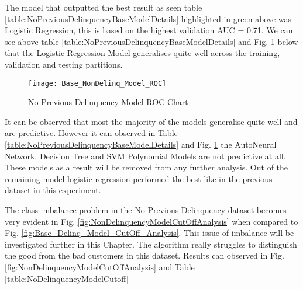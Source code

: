 The model that outputted the best result as seen table \ref{table:NoPreviousDelinquencyBaseModelDetails} highlighted in green above  was Logistic Regression, this is based on the highest validation AUC = 0.71. We can see above table \ref{table:NoPreviousDelinquencyBaseModelDetails} and Fig. \ref{fig:NonDelinq_Model_ROC} below that the Logistic Regression Model generalises quite well across the training, validation and testing partitions.

\begin{figure}[H]
	\texttt{[image: Base\_NonDelinq\_Model\_ROC]}
	\caption{No Previous Delinquency Model ROC Chart}
	\label{fig:NonDelinq_Model_ROC}
\end{figure}

It can be observed that most the majority of the models generalise quite well and are predictive. However it can observed in Table \ref{table:NoPreviousDelinquencyBaseModelDetails} and Fig. \ref{fig:NonDelinq_Model_ROC} the AutoNeural Network, Decision Tree and SVM Polynomial Models are not predictive at all. These models as a result will be removed from any further analysis. Out of the remaining model logistic regression performed the best like in the previous dataset in this experiment. 



The class imbalance problem in the No Previous Delinquency dataset becomes very evident in Fig.  \ref{fig:NonDelinquencyModelCutOffAnalysis} when compared to Fig. \ref{fig:Base_Delinq_Model_CutOff_Analysis}. This issue of imbalance will be investigated further in this Chapter. The algorithm really struggles to distinguish the good from the bad customers in this dataset. Results can observed in Fig. \ref{fig:NonDelinquencyModelCutOffAnalysis} and Table \ref{table:NoDelinquencyModelCutoff}

